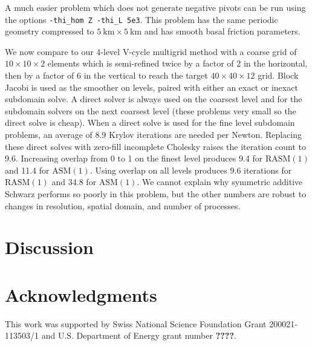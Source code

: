 \documentclass[3p]{elsarticle}
\newcommand{\ASM}{\mathrm{ASM}}
\newcommand{\RASM}{\mathrm{RASM}}
\begin{document}
A much easier problem which does not generate negative pivots can be run using the options \texttt{-thi\_hom Z -thi\_L 5e3}.  This problem has the same periodic geometry compressed to $\SI{5}{\kilo\metre}\times \SI{5}{\kilo\metre}$ and has smooth basal friction parameters.

We now compare to our 4-level V-cycle multigrid method with a coarse grid of $10\times 10\times 2$
elements which is semi-refined twice by a factor of 2 in the horizontal, then by a factor of 6 in
the vertical to reach the target $40\times 40\times 12$ grid.  Block Jacobi is used as the smoother
on levels, paired with either an exact or inexact subdomain solve.  A direct solver is always used
on the coarsest level and for the subdomain solvers on the next coarsest level (these problems very
small so the direct solve is cheap).  When a direct solve is used for the fine level subdomain
problems, an average of 8.9 Krylov iterations are needed per Newton.  Replacing these direct solves
with zero-fill incomplete Cholesky raises the iteration count to 9.6.  Increasing overlap from 0 to
1 on the finest level produces 9.4 for $\RASM(1)$ and 11.4 for $\ASM(1)$.  Using overlap on all
levels produces 9.6 iterations for $\RASM(1)$ and 34.8 for $\ASM(1)$.  We cannot explain why
symmetric additive Schwarz performs so poorly in this problem, but the other numbers are robust to
changes in resolution, spatial domain, and number of processes.

\section{Discussion}

\nonumber\section{Acknowledgments} This work was supported by Swiss National Science Foundation
Grant 200021-113503/1 and U.S. Department of Energy grant number {\bf ????}.



\end{document}
